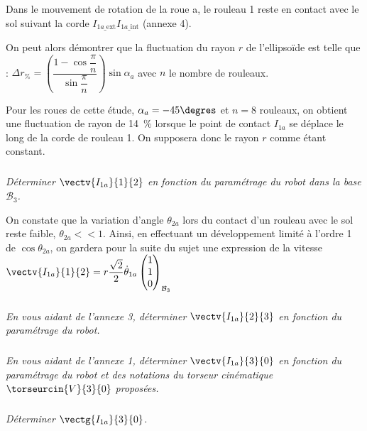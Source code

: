 \begin{multicols}{2}
Dans le mouvement de rotation de la roue a, le rouleau 1 reste en contact avec le sol suivant la corde 
$I_{1a\_\text{ext}}I_{1a\_\text{int}}$ (annexe 4).


On peut alors démontrer que la fluctuation du rayon $r$ de l'ellipsoïde est telle que : $\Delta r_{\%} = \left( \dfrac{1-\cos\dfrac{\pi}{n}}{\sin \dfrac{\pi }{n}}\right)\sin \alpha_a$ avec $n$ le nombre de rouleaux. 


Pour les roues de cette étude, $\alpha_a=-45\degres$ et $n=8$ rouleaux, on obtient une fluctuation de rayon de \SI{14}{\%} lorsque le point de contact $I_{1a}$ se déplace le long de la corde de rouleau 1. On supposera donc le rayon $r$ comme étant constant. 

\subparagraph{}
\textit{Déterminer $\vectv{I_{1a}}{1}{2}$ en fonction du paramétrage du robot dans la base $\mathcal{B}_3$.}
\ifprof%
\begin{corrige}
\end{corrige}\else\fi

On constate que la variation d'angle $\theta_{2a}$ lors du contact d'un rouleau avec le sol reste faible, 
$\theta_{2a} << 1$. Ainsi, en effectuant un développement limité à l'ordre 1 de $\cos \theta_{2a}$, on gardera pour la suite du sujet une expression de la vitesse $\vectv{I_{1a}}{1}{2}=r\dfrac{\sqrt{2}}{2}\dot{\theta}_{1a} \begin{pmatrix}
1 \\ 1 \\ 0 \end{pmatrix}_{\mathcal{B}_3}$


\subparagraph{}
\textit{En vous aidant de l'annexe 3, déterminer $\vectv{I_{1a}}{2}{3}$ en fonction du paramétrage du robot.}
\ifprof%
\begin{corrige}
\end{corrige}\else\fi

\subparagraph{}
\textit{En vous aidant de l'annexe 1, déterminer $\vectv{I_{1a}}{3}{0}$ en fonction du paramétrage du robot et des notations du torseur cinématique $\torseurcin{V}{3}{0}$ proposées.}
\ifprof%
\begin{corrige}
\end{corrige}\else\fi

\subparagraph{}
\textit{Déterminer $\vectg{I_{1a}}{3}{0}$.}
\ifprof%
\begin{corrige}
\end{corrige}\else\fi



\end{multicols}

